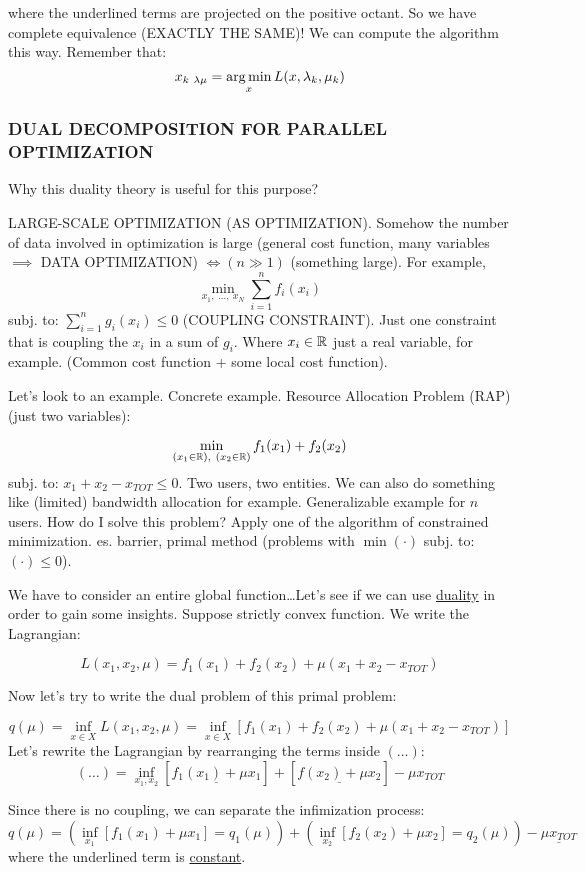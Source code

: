 where the underlined terms are projected on the positive octant. So we have complete equivalence (EXACTLY THE SAME)! We can compute the algorithm this way. Remember that:
\[
	x_{k\ \lambda\mu} = \argmin_x{L(x,\lambda_k,\mu_k)}
\]
	
\subsubsection{DUAL DECOMPOSITION FOR PARALLEL OPTIMIZATION}

Why this duality theory is useful for this purpose?

LARGE-SCALE OPTIMIZATION (AS OPTIMIZATION). Somehow the number of data involved in optimization is large (general cost function, many variables $\implies$ DATA OPTIMIZATION) $\iff (n\gg 1)$ (something large).
For example,
\[
	\min_{x_1,\ \dots,\ x_N}{\sum_{i=1}^n{f_i(x_i)}}
\]
subj. to: $\sum_{i=1}^n{g_i(x_i)}\leq 0$ (COUPLING CONSTRAINT). Just one constraint that is coupling the $x_i$ in a sum of $g_i$. Where $x_i\in\mathbb{R}$ just a real variable, for example.
(Common cost function + some local cost function).

Let's look to an example. Concrete example. Resource Allocation Problem (RAP) (just two variables):

\[
	\min_{(x_1\in\mathbb{R}),\ (x_2\in\mathbb{R})}{f_1(x_1) + f_2(x_2)}
\]
subj. to: $x_1+x_2-x_{TOT}\leq 0$. Two users, two entities. We can also do something like (limited) bandwidth allocation for example. Generalizable example for $n$ users. How do I solve this problem? Apply one of the algorithm of constrained minimization. es. barrier, primal method (problems with $\min{(\mathord{\cdot})}$ subj. to: $(\mathord{\cdot}) \leq 0$).

We have to consider an entire global function\dots Let's see if we can use \underline{duality} in order to gain some insights. Suppose strictly convex function. We write the Lagrangian:

\[
	L(x_1,x_2,\mu) = f_1(x_1) + f_2(x_2) + \mu(x_1+x_2-x_{TOT})
\]

Now let's try to write the dual problem of this primal problem:

\[
	q(\mu) = \inf_{x\in X}{L(x_1,x_2,\mu)} = \inf_{x\in X}{[f_1(x_1)+f_2(x_2) + \mu(x_1+x_2-x_{TOT})]}
\]
Let's rewrite the Lagrangian by rearranging the terms inside $(\dots)$:
\[
	(\dots) = \inf_{x_1,x_2}{[\underline{f_1(x_1) + \mu x_1}] + [\underline{f(x_2) + \mu x_2}] - \mu x_{TOT}}
\]

Since there is no coupling, we can separate the infimization process:
\[
	q(\mu) = (\inf_{x_1}{[f_1(x_1) + \mu x_1]} = q_1(\mu)) + (\inf_{x_2}{[f_2(x_2) + \mu x_2]} = q_2(\mu)) -\underline{\mu x_{TOT}}
\]
where the underlined term is \underline{constant}.

